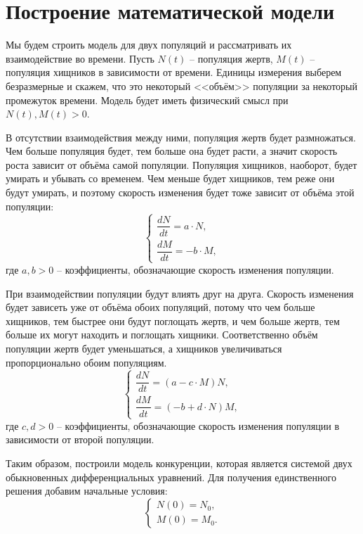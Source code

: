 \section{Построение математической модели}
    Мы будем строить модель для двух популяций и рассматривать их взаимодействие во времени. Пусть $ N(t) $ -- популяция жертв, $ M(t) $ -- популяция хищников в зависимости от времени. Единицы измерения выберем безразмерные и скажем, что это некоторый <<объём>> популяции за некоторый промежуток времени. Модель будет иметь физический смысл при $ N(t), M(t) > 0 $.

    В отсутствии взаимодействия между ними, популяция жертв будет размножаться. Чем больше популяция будет, тем больше она будет расти, а значит скорость роста зависит от объёма самой популяции. Популяция хищников, наоборот, будет умирать и убывать со временем. Чем меньше будет хищников, тем реже они будут умирать, и поэтому скорость изменения будет тоже зависит от объёма этой популяции:
    \[
        \begin{cases}
            \dfrac{dN}{dt} = a \cdot N, \\[.5em]
            \dfrac{dM}{dt} = -b \cdot M,
        \end{cases}
    \]
    где $a, b > 0$ -- коэффициенты, обозначающие скорость изменения популяции.

    При взаимодействии популяции будут влиять друг на друга. Скорость изменения будет зависеть уже от объёма обоих популяций, потому что чем больше хищников, тем быстрее они будут поглощать жертв, и чем больше жертв, тем больше их могут находить и поглощать хищники. Соответственно объём популяции жертв будет уменьшаться, а хищников увеличиваться пропорционально обоим популяциям.
    \[
        \begin{cases}
            \dfrac{dN}{dt} = (a - c \cdot M) N, \\[.5em]
            \dfrac{dM}{dt} = (-b + d \cdot N) M,
        \end{cases}
    \]
    где $ c, d > 0 $ -- коэффициенты, обозначающие скорость изменения популяции в зависимости от второй популяции.

    Таким образом, построили модель конкуренции, которая является системой двух обыкновенных дифференциальных уравнений. Для получения единственного решения добавим начальные условия: 
    \[
        \begin{cases}
            N(0) = N_0, \\[.5em]
            M(0) = M_0.
        \end{cases}
    \]